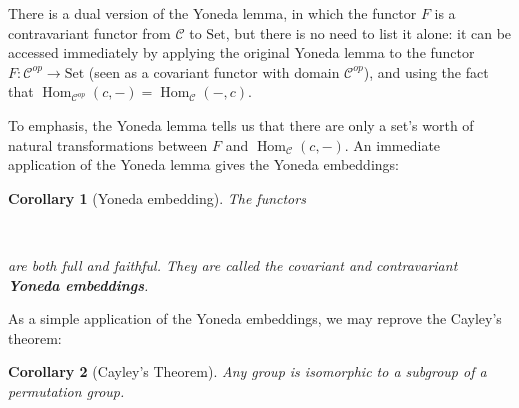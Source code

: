 \documentclass{article}
\newtheorem{corollary}{Corollary}[theorem]
\theoremstyle{definition}
\theoremstyle{definition}
\theoremstyle{remark}
\DeclareMathOperator{\Hom}{Hom}
\begin{document}
	There is a dual version of the Yoneda lemma, in which the functor $F$ is a contravariant functor from $\mathcal{C}$ to $\mathrm{Set}$, but there is no need to list it alone: it can be accessed immediately by applying the original Yoneda lemma to the functor $F:\mathcal{C}^{op}\to \mathrm{Set}$ (seen as a covariant functor with domain $\mathcal{C}^{op}$), and using the fact that $\Hom_{\mathcal{C}^{op}}(c,-)=\Hom_\mathcal{C}(-,c)$. \par
	To emphasis, the Yoneda lemma tells us that there are only a set's worth of natural transformations between $F$ and $\Hom_\mathcal{C}(c,-)$. An immediate application of the Yoneda lemma gives the Yoneda embeddings:
	\begin{corollary}[Yoneda embedding]
		The functors
		\begin{center}
	\ \ \ \ \ \ \ \ \ 
	\end{center}
	are both full and faithful. They are called the covariant and contravariant \textbf{Yoneda embeddings}. 
	\end{corollary}
	As a simple application of the Yoneda embeddings, we may reprove the Cayley's theorem:
	\begin{corollary}[Cayley's Theorem]
	 Any group is isomorphic to a subgroup of a permutation group.
	\end{corollary}
\end{document}
